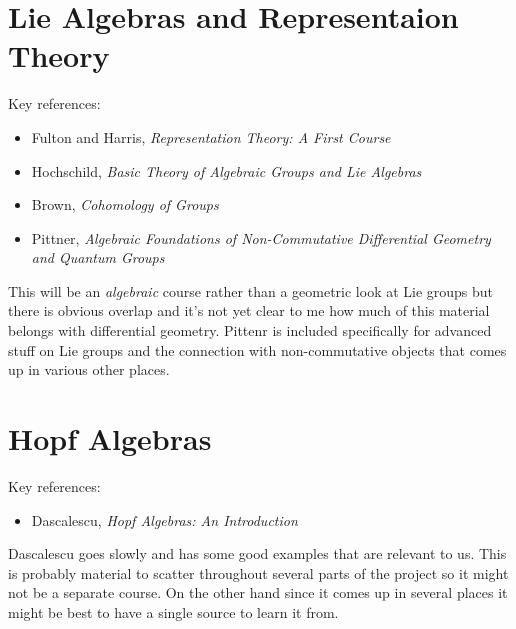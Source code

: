 \documentclass[article]{article}
\begin{document}
\section{Lie Algebras and Representaion Theory}

Key references:
\begin{itemize}
	\item{Fulton and Harris, \textit{Representation Theory: A First Course}}
	\item{Hochschild, \textit{Basic Theory of Algebraic Groups and Lie Algebras}}
	\item{Brown, \textit{Cohomology of Groups}}
	\item{Pittner, \textit{Algebraic Foundations of Non-Commutative Differential Geometry and Quantum Groups}}
\end{itemize}

This will be an \textit{algebraic} course rather than a geometric look at Lie groups but there is obvious overlap and it's not yet clear to me how much of this material belongs with differential geometry. Pittenr is included specifically for advanced stuff on Lie groups and the connection with non-commutative objects that comes up in various other places.

\section{Hopf Algebras}

Key references:
\begin{itemize}
	\item{Dascalescu, \textit{Hopf Algebras: An Introduction}}
\end{itemize}

Dascalescu goes slowly and has some good examples that are relevant to us. This is probably material to scatter throughout several parts of the project so it might not be a separate course. On the other hand since it comes up in several places it might be best to have a single source to learn it from.
\end{document}
